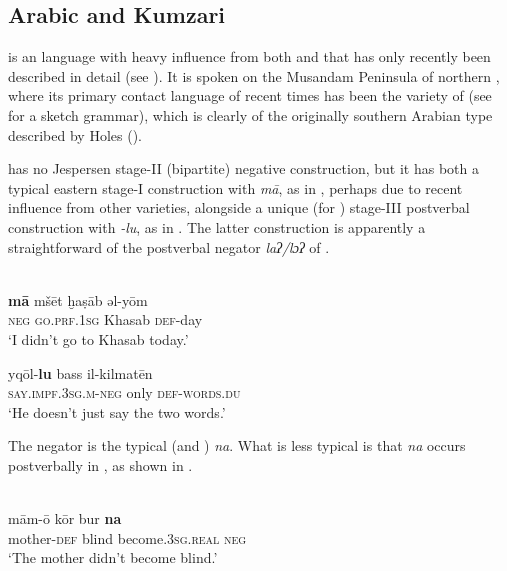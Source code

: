 \documentclass[output=paper]{langsci/langscibook}
\begin{document}
\subsection{Arabic and Kumzari}\label{sec:key:kumz}


 is an  language with heavy influence from both  and  that has only recently been described in detail (see \citealt{WalAnonbyforthcoming}). It is spoken on the Musandam Peninsula of northern , where its primary contact language of recent times has been the  variety of  (see \citealt{Bernabela2011} for a sketch grammar), which is clearly of the originally southern Arabian type described by Holes (\citeyear[18–32]{Holes2016}).

  has no Jespersen stage-II (bipartite) negative construction, but it has both a typical eastern  stage-I construction with \textit{mā}, as in , perhaps due to recent influence from other   varieties, alongside a unique (for ) stage-III postverbal construction with \textit{{}-lu}, as in . The latter construction is apparently a straightforward  of the postverbal negator \textit{laʔ/lɔʔ} of  .


\ea
{  \citep[87]{Bernabela2011}}\\
\ea\gll \textbf{mā} mšēt ḫaṣāb əl-yōm\label{shi.a}\\
     \textsc{neg} \textsc{\textup{go.}}\textsc{prf.1sg} Khasab \textsc{def-}day  \\
\glt ‘I didn’t go to Khasab today.’

\ex\gll yqōl-\textbf{lu} bass il-kilmatēn\label{shi.b}\\
     \textsc{\textup{say.}}\textsc{impf.3sg.m-}\textsc{neg} only \textsc{def-}\textsc{\textup{words.}}\textsc{du}\\
\glt ‘He doesn’t just say the two words.’
\z
\z

The  negator is the typical  (and ) \textit{na}. What is less typical is that \textit{na} occurs postverbally in , as shown in .

\ea\label{kum}
{        \citep[211]{WalAnonbyforthcoming}}\\
\gll mām-ō kōr bur \textbf{na}\\
     mother\textsc{{}-def} blind become.3\textsc{sg.real} \textsc{neg} \\
\glt ‘The mother didn’t become blind.’
\z
\end{document}
